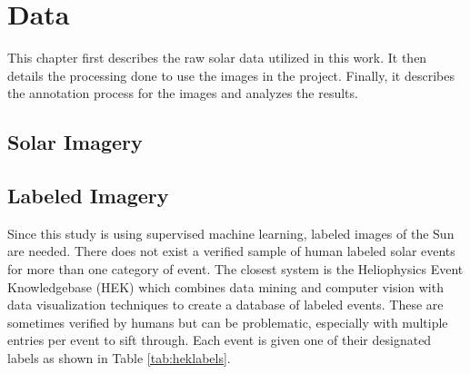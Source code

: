 \documentclass[twoside]{report}
\begin{document}
\chapter{Data} \label{ch:data}

This chapter first describes the raw solar data utilized in this work. It then details the processing done to use the images in the project. Finally, it describes the annotation process for the images and analyzes the results. 

\section{Solar Imagery}

\section{Labeled Imagery} \label{sec:labeling}
Since this study is using supervised machine learning, labeled images of the Sun are needed. There does not exist a verified sample of human labeled solar events for more than one category of event. The closest system is the Heliophysics Event Knowledgebase (HEK) \cite{hurlburt:2012} which combines data mining and computer vision with data visualization techniques to create a database of labeled events. These are sometimes verified by humans but can be problematic, especially with multiple entries per event to sift through. Each event is given one of their designated labels as shown in Table \ref{tab:heklabels}.  
\end{document}
